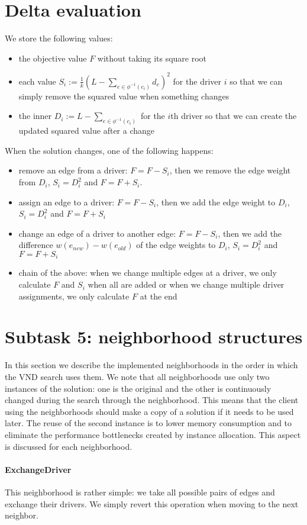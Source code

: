 \documentclass{article}
\begin{document}
\section*{Delta evaluation}
We store the following values:
\begin{itemize}
	\item the objective value $F$ without taking its square root
	\item each value $S_i := \frac{1}{k}(L-\sum_{e\in\phi^{-1}(c_i)}{d_e})^2$ for the driver $i$ so that we can simply remove the squared value when something changes
	\item the inner $D_i := L-\sum_{e\in\phi^{-1}(c_i)}$ for the $i$th driver so that we can create the updated squared value after a change
\end{itemize}
When the solution changes, one of the following happens:
\begin{itemize}
	\item remove an edge from a driver: $F = F - S_i$, then we remove the edge weight from $D_i$, $S_i = D_i^2$ and $F = F + S_i$.
	\item assign an edge to a driver: $F = F - S_i$, then we add the edge weight to $D_i$, $S_i = D_i^2$ and $F = F + S_i$
	\item change an edge of a driver to another edge: $F = F - S_i$, then we add the difference $w(e_{new}) - w(e_{old})$ of the edge weights to $D_i$, $S_i = D_i^2$ and $F = F + S_i$
	\item chain of the above: when we change multiple edges at a driver, we only calculate $F$ and $S_i$ when all are added or when we change multiple driver assignments, we only calculate $F$ at the end
\end{itemize}
\section*{Subtask 5: neighborhood structures}
In this section we describe the implemented neighborhoods in the order in which the VND search uses them. We note that all neighborhoods use only two instances of the solution: one is the original and the other is continuously changed during the search through the neighborhood. This means that the client using the neighborhoods should make a copy of a solution if it needs to be used later. The reuse of the second instance is to lower memory consumption and to eliminate the performance bottlenecks created by instance allocation. This aspect is discussed for each neighborhood.
\paragraph{ExchangeDriver}
This neighborhood is rather simple: we take all possible pairs of edges and exchange their drivers. We simply revert this operation when moving to the next neighbor.
\end{document}
